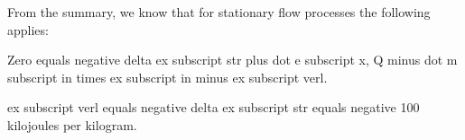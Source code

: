 From the summary, we know that for stationary flow processes the following applies:

Zero equals negative delta ex subscript str plus dot e subscript x, Q minus dot m subscript in times ex subscript in minus ex subscript verl.

ex subscript verl equals negative delta ex subscript str equals negative 100 kilojoules per kilogram.
